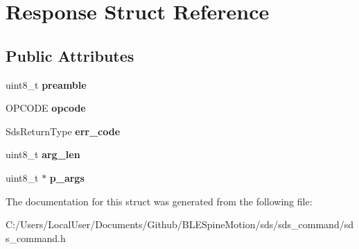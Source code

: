 \hypertarget{struct_response}{}\section{Response Struct Reference}
\label{struct_response}
\subsection*{Public Attributes}
\begin{DoxyCompactItemize}
\item 
\mbox{\label{struct_response_a12e5949e209a81613de69e6f3db8cc75}} 
uint8\+\_\+t {\bfseries preamble}
\item 
\mbox{\label{struct_response_a3bc378436889b07a5315400eb690e4ec}} 
O\+P\+C\+O\+DE {\bfseries opcode}
\item 
\mbox{\label{struct_response_ac758f213ec7ec8acb50e29c17b0cbad6}} 
Sds\+Return\+Type {\bfseries err\+\_\+code}
\item 
\mbox{\label{struct_response_a5313756996c0f03b96e36ff776795923}} 
uint8\+\_\+t {\bfseries arg\+\_\+len}
\item 
\mbox{\label{struct_response_a52a8d893151db21df9bee3caa67e3541}} 
uint8\+\_\+t $\ast$ {\bfseries p\+\_\+args}
\end{DoxyCompactItemize}


The documentation for this struct was generated from the following file\+:\begin{DoxyCompactItemize}
\item 
C\+:/\+Users/\+Local\+User/\+Documents/\+Github/\+B\+L\+E\+Spine\+Motion/sds/sds\+\_\+command/sds\+\_\+command.\+h\end{DoxyCompactItemize}
